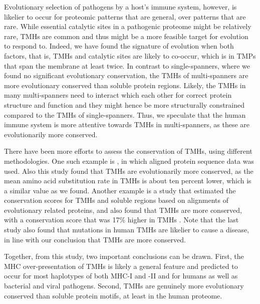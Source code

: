 Evolutionary selection of pathogens by a host's immune system,
however, is likelier to occur for proteomic patterns that are general,
over patterns that are rare.
While essential catalytic sites in a pathogenic proteome
might be relatively rare, TMHs are common and thus might be a more feasible 
target for evolution to respond to.
Indeed, we have found the signature of evolution when both factors,
that is, TMHs and catalytic sites are likely to co-occur,
which is in TMPs that span the membrane at least twice.
In contrast to single-spanners, where we found no significant evolutionary conservation, the TMHs of multi-spanners are more evolutionary conserved than soluble protein regions. Likely, the TMHs in many multi-spanners need to interact which each other for correct protein structure and function and they might hence be more structurally constrained compared to the TMHs of single-spanners.
Thus, we speculate that the human immune system is more attentive 
towards TMHs in multi-spanners, as these are evolutionarily more conserved. 

There have been more efforts to assess the conservation of TMHs,
using different methodologies.
One such example is \cite{stevens2001substitution}, 
in which aligned protein sequence data was used.
Also this study found that TMHs are evolutionarily more conserved,
as the mean amino acid substitution rate in TMHs is about ten
percent lower,
which is a similar value as we found.
Another example is a study that estimated the conservation
scores for TMHs and soluble regions based on 
alignments of evolutionary related proteins,
and also found that TMHs are more conserved, 
with a conservation score that was 17\% higher in 
TMHs \cite{oberai2009structural}.
Note that the last study also found that mutations in human TMHs are likelier to cause
a disease, in line with our conclusion that TMHs are more conserved.


Together, from this study, two important conclusions can be drawn. 
First, the MHC over-presentation of TMHs is likely a general feature 
and predicted to occur for most haplotypes of both MHC-I and -II 
and for humans as well as bacterial and viral pathogens. 
Second, TMHs are genuinely more evolutionary conserved than soluble protein motifs, 
at least in the human proteome. 

